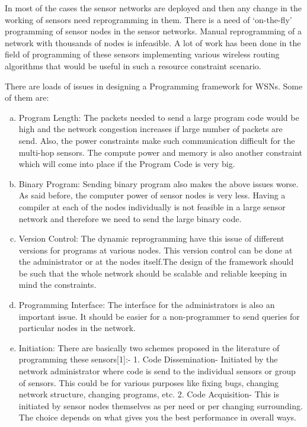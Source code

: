\documentclass[twocolumn]{article}
\begin{document}
In most of the cases the sensor networks are deployed and then any change in the working of sensors need reprogramming in them. There is a need of ‘on-the-fly’ programming of sensor nodes in the sensor networks. Manual reprogramming of a network with thousands of nodes is infeasible. A lot of work has been done in the field of programming of these sensors implementing various wireless routing algorithms that would be useful in such a resource constraint scenario.

There are loads of issues in designing a Programming framework for WSNs. Some of them are:
\begin{enumerate}[a)]
\item Program Length: The packets needed to send a large program code would be high and the network congestion increases if large number of packets are send. Also, the power constraints make such communication difficult for the multi-hop sensors. The compute power and memory is also another constraint which will come into place if the Program Code is very big.

\item Binary Program: Sending binary program also makes the above issues worse. As said before, the computer power of sensor nodes is very less. Having a compiler at each of the nodes individually is not feasible in a large sensor network and therefore we need to send the large binary code.

\item Version Control: The dynamic reprogramming have this issue of different versions for programs at various nodes. This version control can be done at the administrator or at the nodes itself.The design of the framework should be such that the whole network should be scalable and reliable keeping in mind the constraints.

\item Programming Interface: The interface for the administrators is also an important issue. It should be easier for a non-programmer to send queries for particular nodes in the network.

\item Initiation: There are basically two schemes proposed in the literature of programming these sensors[1]:-
1. Code Dissemination- Initiated by the network administrator where code is send to the individual sensors or group of sensors. This could be for various purposes like fixing bugs, changing network structure, changing programs, etc.
2. Code Acquisition- This is initiated by sensor nodes themselves as per need or per changing surrounding.
The choice depends on what gives you the best performance in overall ways.
\end{enumerate}
\end{document}
